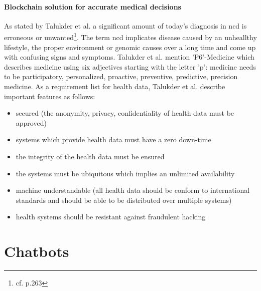 \paragraph{Blockchain solution for accurate medical decisions}
As stated by Talukder et al. a significant amount of today's diagnosis in \ac{ncd} is 	
erroneous or unwanted\footnote{cf.\autocite{talukder} p.263}. The term \ac{ncd} implicates disease caused by an unheallthy lifestyle, the proper environment or genomic causes over a long time and come up with confusing signs and symptoms.
Talukder et al. mention 'P6'-Medicine which describes medicine using six adjectives starting with the letter 'p': medicine needs to be participatory, personalized, proactive, preventive, predictive, precision medicine.
As a requirement list for health data, Talukder et al. describe important features as follows: 

\begin{itemize}
\setlength\itemsep{-0.5em}
  \item secured (the anonymity, privacy, confidentiality of health data must be approved)
  \item systems which provide health data must have a zero down-time 
  \item the integrity of the health data must be ensured
  \item the systems must be ubiquitous which implies an unlimited availability
  \item machine understandable (all health data should be conform to international standards and should be able to be distributed over multiple systems)
  \item health systems should be resistant against fraudulent hacking
\end{itemize}

\section{Chatbots} 

